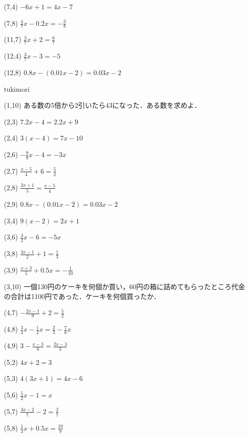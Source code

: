 \documentclass[a4paper,fleqn,papersize,15pt]{jsarticle}
\begin{document}
(7,4)  \large     $-6x + 1 = 4x -7$

(7,8)  \large     $\frac{4}{7}x -0.2x = - \frac{3}{8}$

(11,7)     \large     $\frac{3}{7}x + 2 = \frac{6}{7}$

(12,4)     \large     $\frac{3}{7}x -3 = -5$   \begin{flushright}\framebox[8em]{\rule{0pt}{6ex}}\end{flushright}

(12,8)     \large     $0.8x-(0.01x-2) = 0.03x-2$   \begin{flushright}\framebox[8em]{\rule{0pt}{6ex}}\end{flushright}

\clearpage
tukimori

 (1,10)  \large     ある数の5倍から2引いたら43になった．ある数を求めよ．

(2,3)  \large     $7.2x -4 = 2.2x + 9$

(2,4)  \large     $3(x -4) = 7x -10$

(2,6)  \large     $- \frac{9}{8}x -4 = -3x$

(2,7)  \large     $\frac{x-5}{4} + 6 = \frac{5}{2}$

(2,8)  \large     $\frac{2x+1}{5}  = \frac{x-5}{4}$

(2,9)  \large     $0.8x-(0.01x-2) = 0.03x-2$

(3,4)  \large     $9(x -2) = 2x + 1$

(3,6)  \large     $\frac{3}{2}x -6 = -5x$

(3,8)  \large     $\frac{3x-1}{2} + 1 = \frac{1}{3}$

(3,9)  \large     $\frac{x+3}{5} +0.5x = -\frac{1}{10}$

(3,10)  \large     一個130円のケーキを何個か買い，60円の箱に詰めてもらったところ代金の合計は1100円であった．ケーキを何個買ったか．

(4,7)  \large     $- \frac{2x-1}{9} + 2 = \frac{5}{2}$

(4,8)  \large     $\frac{3}{4}x-\frac{1}{2}x = \frac{2}{3}-\frac{7}{6}x$

(4,9)  \large     $ 3 - \frac{x-3}{6} = \frac{2x-3}{3}$

(5,2)  \large     $4x + 2 = 3$

(5,3)  \large     $4(3x + 1) = 4x -6$

(5,6)  \large     $\frac{5}{2}x -1 = x$

(5,7)  \large     $\frac{3x-2}{7} -2 = \frac{2}{7}$

(5,8)  \large     $\frac{1}{3}x + 0.5x  = \frac{10}{9}$
\end{document}
